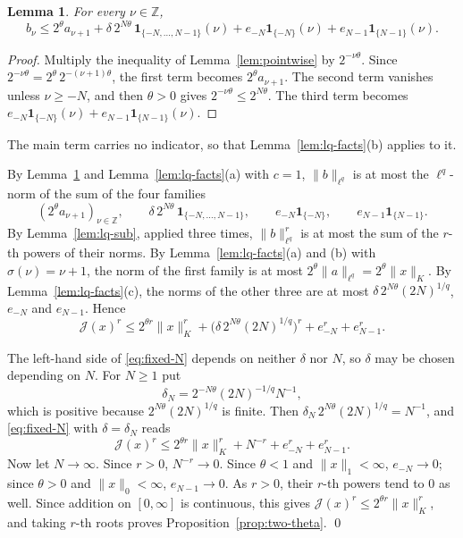 \documentclass[11pt]{article}
\newtheorem{lemma}[theorem]{Lemma}
\theoremstyle{definition}
\theoremstyle{remark}
\newcommand{\norm}[2]{\lVert #1\rVert_{#2}}
\newcommand{\cJ}{\mathcal J}
\newcommand{\Z}{\mathbb Z}
\newcommand{\one}{\mathbf 1}
\begin{document}
\begin{lemma}\label{lem:termwise}
  For every \(\nu \in \Z\),
  \[
    b_\nu \le 2^\theta a_{\nu+1} + \delta\, 2^{N\theta}\, \one_{\{-N, \dots, N-1\}}(\nu)
      + e_{-N}\one_{\{-N\}}(\nu) + e_{N-1}\one_{\{N-1\}}(\nu) .
  \]
\end{lemma}

\begin{proof}
  Multiply the inequality of Lemma~\ref{lem:pointwise} by \(2^{-\nu\theta}\). Since
  \(2^{-\nu\theta} = 2^\theta\, 2^{-(\nu+1)\theta}\), the first term becomes
  \(2^\theta a_{\nu+1}\). The second term vanishes unless \(\nu \ge -N\), and then
  \(\theta > 0\) gives \(2^{-\nu\theta} \le 2^{N\theta}\). The third term becomes
  \(e_{-N}\one_{\{-N\}}(\nu) + e_{N-1}\one_{\{N-1\}}(\nu)\).
\end{proof}

The main term carries no indicator, so that Lemma~\ref{lem:lq-facts}(b) applies to it.

By Lemma~\ref{lem:termwise} and
Lemma~\ref{lem:lq-facts}(a) with \(c = 1\), \(\norm{b}{\ell^q}\) is at most the
\(\ell^q\)-norm of the sum of the four families
\[
  (2^\theta a_{\nu+1})_{\nu \in \Z}, \qquad
  \delta\, 2^{N\theta}\, \one_{\{-N, \dots, N-1\}}, \qquad
  e_{-N}\one_{\{-N\}}, \qquad
  e_{N-1}\one_{\{N-1\}} .
\]
By Lemma~\ref{lem:lq-sub}, applied three times, \(\norm{b}{\ell^q}^r\) is at most the sum of
the \(r\)-th powers of their norms. By Lemma~\ref{lem:lq-facts}(a) and (b) with \(\sigma(\nu) = \nu + 1\), the
norm of the first family is at most \(2^\theta \norm{a}{\ell^q} = 2^\theta \norm{x}{K}\). By
Lemma~\ref{lem:lq-facts}(c), the norms of the other three are at most
\(\delta\, 2^{N\theta} (2N)^{1/q}\), \(e_{-N}\) and \(e_{N-1}\). Hence
\begin{equation}\label{eq:fixed-N}
  \cJ(x)^r \le 2^{\theta r}\norm{x}{K}^r + \bigl(\delta\, 2^{N\theta} (2N)^{1/q}\bigr)^r
    + e_{-N}^r + e_{N-1}^r .
\end{equation}

The left-hand side of \eqref{eq:fixed-N} depends on neither \(\delta\) nor \(N\), so
\(\delta\) may be chosen depending on \(N\). For \(N \ge 1\) put
\[
  \delta_N = 2^{-N\theta} (2N)^{-1/q} N^{-1} ,
\]
which is positive because \(2^{N\theta} (2N)^{1/q}\) is finite. Then
\(\delta_N\, 2^{N\theta} (2N)^{1/q} = N^{-1}\), and \eqref{eq:fixed-N} with
\(\delta = \delta_N\) reads
\[
  \cJ(x)^r \le 2^{\theta r}\norm{x}{K}^r + N^{-r} + e_{-N}^r + e_{N-1}^r .
\]
Now let \(N \to \infty\). Since \(r > 0\), \(N^{-r} \to 0\). Since \(\theta < 1\) and
\(\norm{x}{1} < \infty\), \(e_{-N} \to 0\); since \(\theta > 0\) and
\(\norm{x}{0} < \infty\), \(e_{N-1} \to 0\). As \(r > 0\), their \(r\)-th powers tend to
\(0\) as well. Since addition on \([0,\infty]\) is continuous, this gives
\(\cJ(x)^r \le 2^{\theta r}\norm{x}{K}^r\), and taking \(r\)-th roots proves
Proposition~\ref{prop:two-theta}.
\qed
\end{document}
